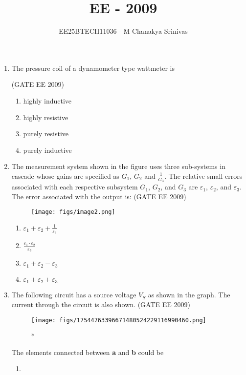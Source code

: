 \documentclass[journal,12pt,onecolumn]{IEEEtran}
\title{\LARGE \textbf{EE - 2009}}
\author{\Large EE25BTECH11036 - M Chanakya Srinivas}
\date{}
\theoremstyle{remark}
\begin{document}
\maketitle
\begin{flushleft}
\begin{enumerate}

\item The pressure coil of a dynamometer type wattmeter is 

\hfill(GATE EE 2009)

\begin{enumerate}
    \item highly inductive  
\item  highly resistive  
\item  purely resistive  
\item purely inductive

\end{enumerate}


\item The measurement system shown in the figure uses three sub-systems in cascade whose gains are specified as $G_1$, $G_2$ and $\frac{1}{G_3}$. The relative small errors associated with each respective subsystem $G_1$, $G_2$, and $G_3$ are $\varepsilon_1$, $\varepsilon_2$, and $\varepsilon_3$. The error associated with the output is: 
\hfill(GATE EE 2009)
\begin{figure}[H]
    \centering
    \texttt{[image: figs/image2.png]}
    \caption{}
    \label{fig:placeholder}
\end{figure}

\begin{enumerate}
    \item  $\varepsilon_1 + \varepsilon_2 + \frac{1}{\varepsilon_3}$  
 \item $\frac{\varepsilon_1 \cdot \varepsilon_2}{\varepsilon_3}$  
 \item $\varepsilon_1 + \varepsilon_2 - \varepsilon_3$  
 \item $\varepsilon_1 + \varepsilon_2 + \varepsilon_3$
\end{enumerate}


\item The following circuit has a source voltage $V_S$ as shown in the graph. The current through the circuit is also shown. 
\hfill(GATE EE 2009)

\begin{figure}[h!]
    \centering
    \texttt{[image: figs/17544763396671480524229116990460.png]}
    \caption{*}
\label{fig:placeholder}
\end{figure}
The elements connected between \textbf{a} and \textbf{b} could be 
 \begin{enumerate}
     \item  {}



\end{enumerate}
\end{enumerate}
\end{flushleft}
\end{document}
